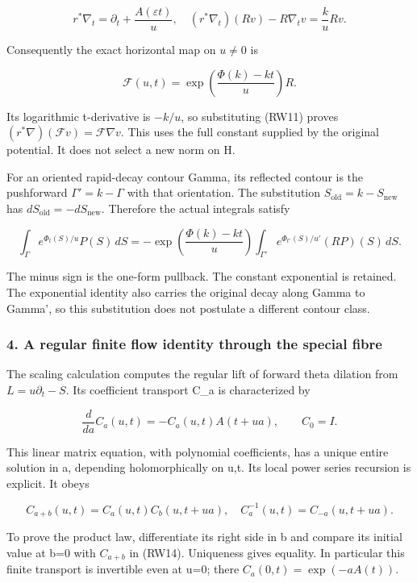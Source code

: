 \documentclass{article}
\begin{document}
\[
r^*\nabla_t=\partial_t+\frac{A(\varepsilon t)}u,
\quad
(r^*\nabla_t)(Rv)-R\nabla_tv=\frac ku Rv.
\tag{RW11}
\]

Consequently the exact horizontal map on \(u\ne0\) is

\[
\boxed{\mathcal F(u,t)
=\exp\!\left(\frac{\Phi(k)-kt}{u}\right)R.}
\tag{RW12}
\]

Its logarithmic t-derivative is \(-k/u\), so substituting (RW11) proves \((r^*\nabla)(\mathcal Fv)=\mathcal F\nabla v\). This uses the full constant supplied by the original potential. It does not select a new norm on H.

For an oriented rapid-decay contour Gamma, its reflected contour is the pushforward \(\Gamma'=k-\Gamma\) with that orientation. The substitution \(S_{\mathrm{old}}=k-S_{\mathrm{new}}\) has \(dS_{\mathrm{old}}=-dS_{\mathrm{new}}\). Therefore the actual integrals satisfy

\[
\int_\Gamma e^{\Phi_t(S)/u}P(S)\,dS
=-\exp\!\left(\frac{\Phi(k)-kt}{u}\right)
\int_{\Gamma'} e^{\Phi_{t'}(S)/u'}(RP)(S)\,dS.
\tag{RW13}
\]

The minus sign is the one-form pullback. The constant exponential is retained. The exponential identity also carries the original decay along Gamma to Gamma', so this substitution does not postulate a different contour class.

\subsubsection{4. A regular finite flow identity through the special fibre}\label{endpoint-f1_reflection--a-regular-finite-flow-identity-through-the-special-fibre}

The scaling calculation computes the regular lift of forward theta dilation from \(L=u\partial_t-S\). Its coefficient transport C\_a is characterized by

\[
\frac{d}{da}C_a(u,t)=-C_a(u,t)A(t+ua),\qquad C_0=I.
\tag{RW14}
\]

This linear matrix equation, with polynomial coefficients, has a unique entire solution in a, depending holomorphically on u,t. Its local power series recursion is explicit. It obeys

\[
C_{a+b}(u,t)=C_a(u,t)C_b(u,t+ua),
\quad C_a^{-1}(u,t)=C_{-a}(u,t+ua).
\tag{RW15}
\]

To prove the product law, differentiate its right side in b and compare its initial value at b=0 with \(C_{a+b}\) in (RW14). Uniqueness gives equality. In particular this finite transport is invertible even at u=0; there \(C_a(0,t)=\exp(-aA(t))\).
\end{document}
